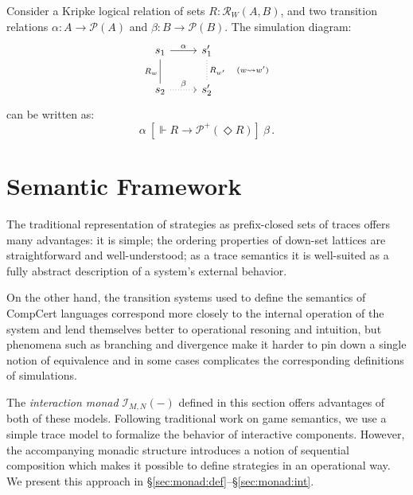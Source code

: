 \documentclass[acmsmall,timestamp,review]{acmart}
\newcommand{\ifr}[1]{\ [{#1}]\ }
\begin{document}
\begin{example}
\label{ex:sim}
Consider a Kripke logical relation of sets $R : \mathcal{R}_W(A, B)$,
and two transition relations $\alpha : A \rightarrow \mathcal{P}(A)$
and $\beta : B \rightarrow \mathcal{P}(B)$.
The simulation diagram:
\[
  \begin{tikzcd}
    s_1 \arrow[r, "\alpha"]
        \arrow[d, dash, "R_w"'] &
    s_1' \arrow[d, dotted, dash, "R_{w'} \quad (w \leadsto w')"] \\
    s_2 \arrow[r, dotted, "\beta"] &
    s_2'
  \end{tikzcd}
\]
can be written as:
\[
  \alpha \ifr{\Vdash R \rightarrow \mathcal{P}^+(\Diamond R)} \beta \,.
\]
\end{example}




\section{Semantic Framework} \label{sec:monad} %


The traditional representation of strategies as
prefix-closed sets of traces
offers many advantages:
it is simple;
the ordering properties of down-set lattices
are straightforward and well-understood;
as a trace semantics
it is well-suited as a fully abstract description
of a system's external behavior.

On the other hand,
the transition systems
used to define the semantics of CompCert languages
correspond more closely to the internal operation of the system
and lend themselves better
to operational resoning and intuition,
but phenomena such as branching and divergence
make it harder to pin down a single notion of equivalence \cite{blts}
and in some cases complicates the corresponding definitions of simulations.

The \emph{interaction monad} $\mathcal{I}_{M,N}(-)$
defined in this section offers advantages of both of these models.
Following traditional work on game semantics,
we use a simple trace model to formalize
the behavior of interactive components.
However,
the accompanying monadic structure
introduces a notion of sequential composition
which makes it possible to define strategies
in an operational way.
We present this approach in \S\ref{sec:monad:def}--\S\ref{sec:monad:int}.
\end{document}
